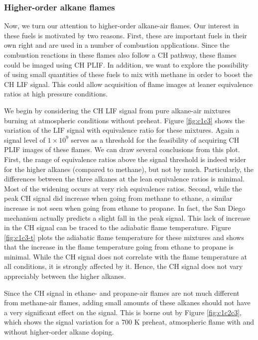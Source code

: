 

\subsubsection{Higher-order alkane flames}

Now, we turn our attention to higher-order alkane-air flames.
Our interest in these fuels is motivated by two reasons.
First, these are important fuels in their own right and are used in a number of combustion applications.
Since the combustion reactions in these flames also follow a CH pathway, these flames could be imaged using CH PLIF.
In addition, we want to explore the possibility of using small quantities of these fuels to mix with methane in order to boost the CH LIF signal.
This could allow acquisition of flame images at leaner equivalence ratios at high pressure conditions.

We begin by considering the CH LIF signal from pure alkane-air mixtures burning at atmospheric conditions without preheat.
Figure \ref{fig:c1c3} shows the variation of the LIF signal with equivalence ratio for these mixtures.
Again a signal level of \(1\times10^9\) serves as a threshold for the feasibility of acquiring CH PLIF images of these flames.
We can draw several conclusions from this plot.
First, the range of equivalence ratios above the signal threshold is indeed wider for the higher alkanes (compared to methane), but not by much.
Particularly, the differences between the three alkanes at the lean equivalence ratios is minimal.
Most of the widening occurs at very rich equivalence ratios.
Second, while the peak CH signal did increase when going from methane to ethane, a similar increase is not seen when going from ethane to propane.
In fact, the San Diego mechanism actually predicts a slight fall in the peak signal.
This lack of increase in the CH signal can be traced to the adiabatic flame temperature.
Figure \ref{fig:c1c3-t} plots the adiabatic flame temperature for these mixtures and shows that the increase in the flame temperature going from ethane to propane is minimal.
While the CH signal does not correlate with the flame temperature at all conditions, it is strongly affected by it.
Hence, the CH signal does not vary appreciably between the higher alkanes.




Since the CH signal in ethane- and propane-air flames are not much different from methane-air flames, adding small amounts of these alkanes should not have a very significant effect on the signal.
This is borne out by Figure \ref{fig:c1c2c3}, which shows the signal variation for a 700 K preheat, atmospheric flame with and without higher-order alkane doping.

